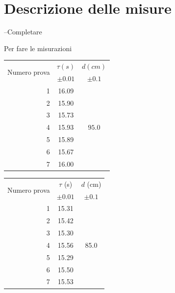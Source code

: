 \documentclass{article}
\begin{document}
\section{Descrizione delle misure}

--Completare

Per fare le misurazioni

\begin{table}[h!]
	\hspace{-0.1\textwidth}	
	\begin{minipage}{0.1\textwidth}
		\centering
		\begin{tabular}{ | r | c | c | }
			\hline
			\multirow{2}{5em}{Numero prova}& $\tau (s)$ & $d (cm) $ \\
			& $\pm 0.01$ & $\pm 0.1$ \\
			\hline
			1 & 16.09 & \multirow{7}{1em}{$95.0$} \\ \cline{1-2}
			2 & 15.90 & \\	\cline{1-2}
			3 & 	15.73 & \\	\cline{1-2}
			4 &	15.93 & \\	\cline{1-2}
			5 &	15.89 & \\	\cline{1-2}
			6 &	15.67 & \\	\cline{1-2}
			7 &	16.00 & \\	\cline{1-2}
			\hline
		\end{tabular}
	\end{minipage}
	\hspace{0.3\textwidth}
	\begin{minipage}{0.1\textwidth}
		\centering
		\begin{tabular}{ | r | c | c | }
    		\hline
    		\multirow{2}{5em}{Numero prova} & $\tau$ (s) & $d$ (cm) \\
    		& $\pm 0.01$ & $\pm 0.1$ \\
    		\hline
    		1 & 15.31 & \multirow{7}{*}{85.0} \\ \cline{1-2}
    		2 & 15.42 & \\ \cline{1-2}
    		3 & 15.30 & \\ \cline{1-2}
    		4 & 15.56 & \\ \cline{1-2}
    		5 & 15.29 & \\ \cline{1-2}
    		6 & 15.50 & \\ \cline{1-2}
    		7 & 15.53 & \\ \cline{1-2}
    		\hline
		\end{tabular}
	\end{minipage}
	\hspace{0.3\textwidth}

\end{table}
\end{document}
